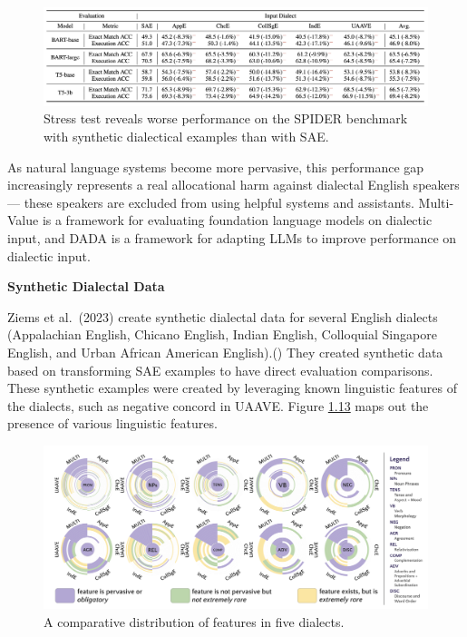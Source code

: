 \documentclass[
  letterpaper,
  DIV=11,
  numbers=noendperiod,
  oneside]{scrreprt}
\theoremstyle{remark}
\begin{document}
\begin{figure}[H]

{\centering \includegraphics[width=1\textwidth,height=\textheight]{src/Figures/MV2.png}

}

\caption{Stress test reveals worse performance on the SPIDER benchmark
with synthetic dialectical examples than with SAE.}

\end{figure}%

As natural language systems become more pervasive, this performance gap
increasingly represents a real allocational harm against dialectal
English speakers --- these speakers are excluded from using helpful
systems and assistants. Multi-Value is a framework for evaluating
foundation language models on dialectic input, and DADA is a framework
for adapting LLMs to improve performance on dialectic input.

\textbf{Synthetic Dialectal Data}

Ziems et al.~(2023) create synthetic dialectal data for several English
dialects (Appalachian English, Chicano English, Indian English,
Colloquial Singapore English, and Urban African American
English).() They created synthetic
data based on transforming SAE examples to have direct evaluation
comparisons. These synthetic examples were created by leveraging known
linguistic features of the dialects, such as negative concord in UAAVE.
Figure \hyperref[fig:features_dialects]{1.13} maps out the presence of
various linguistic features.

\begin{figure}

{\centering \includegraphics[width=1\textwidth,height=\textheight]{src/Figures/MV1.png}

}

\caption{A comparative distribution of features in five dialects.}

\end{figure}%
\end{document}
